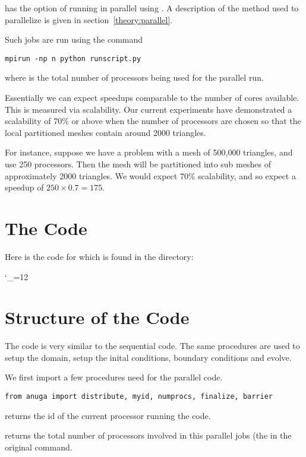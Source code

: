\documentclass{manual}
\newcommand{\verbatiminputB}[1]{%
\endgroup}
\def\verbatiminputunderscore{\begingroup
\catcode`\_=12
\verbatiminputB}
\begin{document}
\anuga has the option of running in parallel using \mpi. A description of the method used to parallelize \anuga is given in section~\ref{theory:parallel}.

Such jobs are run using the command

\begin{verbatim}
mpirun -np n python runscript.py
\end{verbatim}
where  is the total number of processors being used for the parallel run.

Essentially we can expect speedups comparable to the number of cores available. This is measured via scalability. Our current experiments have demonstrated a scalability of 70\% or above when the number of processors are chosen so that the local partitioned meshes contain around 2000 triangles.

For instance, suppose we have a problem with a mesh of 500,000 triangles, and use 250 processors. Then the mesh will be partitioned into sub meshes of approximately 2000 triangles.
We would expect 70\% scalability, and so expect a speedup of $250 \times 0.7 = 175$.

\section{The Code}

Here is the code for  which is found in the  directory:

\verbatiminputunderscore{../../anuga_core/examples/cairns/runParallelCairns.py}


\section{Structure of the Code}

The code is very similar to the sequential code. The same procedures are used to setup the domain, setup the inital conditions, boundary conditions and evolve.


We first import a few procedures  need for the parallel code.
\begin{verbatim}
from anuga import distribute, myid, numprocs, finalize, barrier
\end{verbatim}

 returns the id of the current processor running the code.

 returns the total number of processors involved in this parallel jobs (the  in the original  command.
\end{document}
